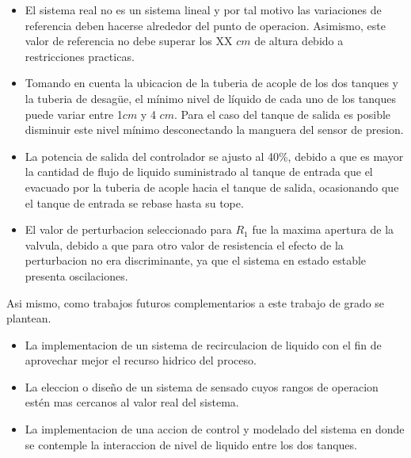 \documentclass[a4paper,12pt,twoside]{proyectotanquesecci}
\begin{document}
\begin{itemize}
\item El sistema real no es un sistema lineal y por tal motivo las variaciones de referencia deben hacerse alrededor del punto de operacion. Asimismo, este valor de referencia no debe superar los XX $cm$ de altura debido a restricciones practicas.

\item Tomando en cuenta la ubicacion de la tuberia de acople de los dos tanques y la tuberia de desag\"ue, el mínimo nivel de líquido de cada uno de los tanques puede variar entre 1$cm$ y 4 $cm$. Para el caso del tanque de salida es posible disminuir este nivel mínimo desconectando la manguera del sensor de presion.

\item La potencia de salida del controlador se ajusto al 40\%, debido a que es mayor la cantidad de flujo de liquido suministrado al tanque de entrada que el evacuado por la tuberia de acople hacia el tanque de salida, ocasionando que el tanque de entrada se rebase hasta su tope.

\item El valor de perturbacion seleccionado para $R_{1}$ fue la maxima apertura de la valvula, debido a que para otro valor de resistencia el efecto de la perturbacion no era discriminante, ya que el sistema en estado estable presenta oscilaciones.
\end{itemize}

Asi mismo, como trabajos futuros complementarios a este trabajo de grado se plantean. \\

\begin{itemize}
\item La implementacion de un sistema de recirculacion de liquido con el fin de aprovechar mejor el recurso hidrico del proceso.
\item La eleccion o diseño de un sistema de sensado cuyos rangos de operacion estén mas cercanos al valor real del sistema.
\item La implementacion de una accion de control y modelado del sistema en donde se contemple la interaccion de nivel de liquido entre los dos tanques.
\end{itemize}





\end{document}
